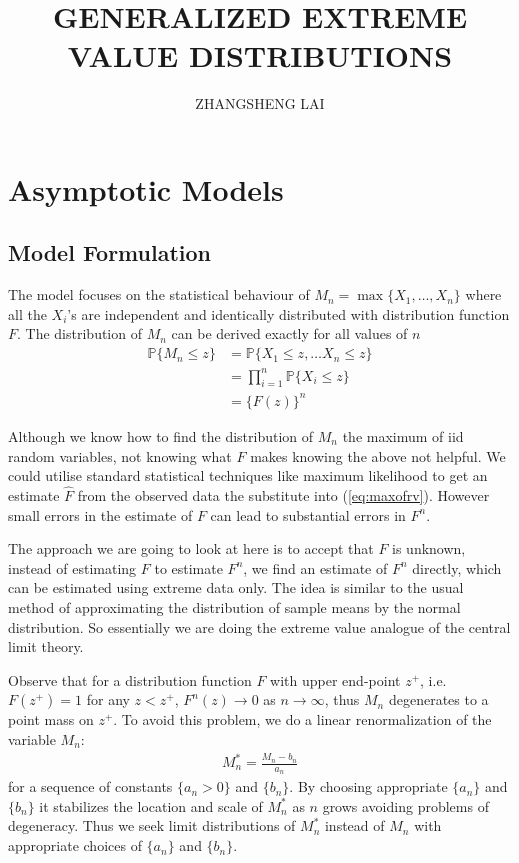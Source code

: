 \documentclass[a4paper,10pt]{article}
\theoremstyle{definition}
\numberwithin{equation}{section}
\begin{document}

\title{\large \bf GENERALIZED EXTREME VALUE DISTRIBUTIONS}
\author{\small ZHANGSHENG LAI}
\date{}
\maketitle

\section{Asymptotic Models}
\subsection{Model Formulation}
The model focuses on the statistical behaviour of $M_n = \max\{X_1,\ldots,X_n\}$ where all the $X_i$'s are independent and identically distributed with distribution function $F$. The distribution of $M_n$ can be derived exactly for all values of $n$
\begin{align}
\mathbb{P}\{M_n\leq z\} &= \mathbb{P}\{X_1\leq z , \ldots X_n \leq z\}\nonumber\\
&= \prod_{i=1}^{n}\mathbb{P}\{X_i\leq z\}\nonumber\\
&=\{F(z)\}^n \label{eq:maxofrv}
\end{align}

Although we know how to find the distribution of $M_n$ the maximum of iid random variables, not knowing what $F$ makes knowing the above not helpful. We could utilise standard statistical techniques like maximum likelihood to get an estimate $\widehat{F}$ from the observed data the substitute into (\ref{eq:maxofrv}). However small errors in the estimate of $F$ can lead to substantial errors in $F^n$.

The approach we are going to look at here is to accept that $F$ is unknown, instead of estimating $F$ to estimate $F^n$, we find an estimate of $F^n$ directly, which can be estimated using extreme data only. The idea is similar to the usual method of approximating the distribution of sample means by the normal distribution. So essentially we are doing the extreme value analogue of the central limit theory.

Observe that for a distribution function $F$ with upper end-point $z^+$, i.e. $F(z^+) = 1$ for any $z<z^+$, $F^n(z) \to 0$ as $n \to \infty$, thus $M_n$ degenerates to a point mass on $z^+$. To avoid this problem, we do a linear renormalization of the variable $M_n$:
\begin{align*}
M_n^\ast = \frac{M_n - b_n}{a_n}
\end{align*}
for a sequence of constants $\{a_n>0\}$ and $\{b_n\}$. By choosing appropriate $\{a_n\}$ and $\{b_n\}$ it stabilizes the location and scale of $M_n^\ast$ as $n$ grows avoiding problems of degeneracy. Thus we seek limit distributions of $M_n^\ast$ instead of $M_n$ with appropriate choices of $\{a_n\}$ and $\{b_n\}$.
\end{document}
